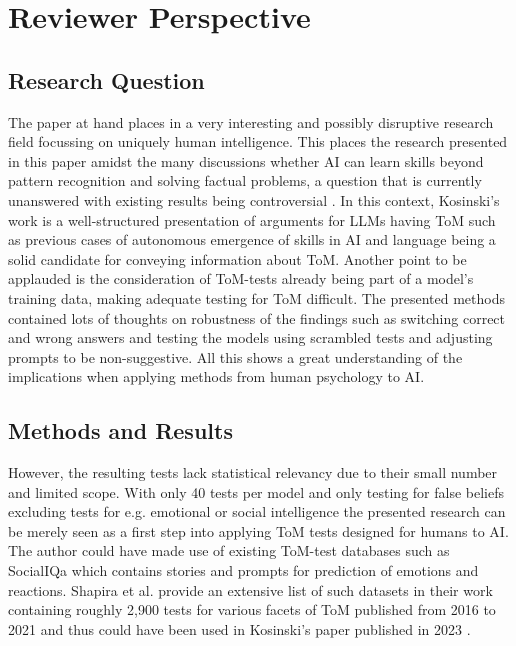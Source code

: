 \section{Reviewer Perspective}
\subsection{Research Question}
The paper at hand places in a very interesting and possibly disruptive research field focussing on uniquely human intelligence. This places the research presented in this paper amidst the many discussions whether AI can learn skills beyond pattern recognition and solving factual problems, a question that is currently unanswered with existing results being controversial \cite{critics1}. In this context, Kosinski's work is a well-structured presentation of arguments for LLMs having ToM such as previous cases of autonomous emergence of skills in AI and language being a solid candidate for conveying information about ToM. Another point to be applauded is the consideration of ToM-tests already being part of a model's training data, making adequate testing for ToM difficult. The presented methods contained lots of thoughts on robustness of the findings such as switching correct and wrong answers and testing the models using scrambled tests and adjusting prompts to be non-suggestive. All this shows a great understanding of the implications when applying methods from human psychology to AI.

\subsection{Methods and Results}
However, the resulting tests lack statistical relevancy due to their small number and limited scope. With only 40 tests per model and only testing for false beliefs excluding tests for e.g. emotional or social intelligence the presented research can be merely seen as a first step into applying ToM tests designed for humans to AI. The author could have made use of existing ToM-test databases such as SocialIQa \cite{socialiqa} which contains stories and prompts for prediction of emotions and reactions. Shapira et al. provide an extensive list of such datasets in their work containing roughly 2,900 tests for various facets of ToM published from 2016 to 2021 and thus could have been used in Kosinski's paper published in 2023 \cite{critics1}.
 
